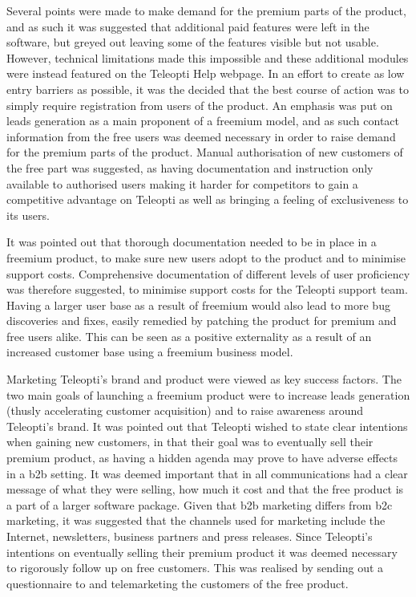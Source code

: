 Several points were made to make demand for the premium parts of the product, and as such it was suggested that additional paid features were left in the software, but greyed out leaving some of the features visible but not usable. However, technical limitations made this impossible and these additional modules were instead featured on the Teleopti Help webpage. In an effort to create as low entry barriers as possible, it was the decided that the best course of action was to simply require registration from users of the product. An emphasis was put on leads generation as a main proponent of a freemium model, and as such contact information from the free users was deemed necessary in order to raise demand for the premium parts of the product. Manual authorisation of new customers of the free part was suggested, as having documentation and instruction only available to authorised users making it harder for competitors to gain a competitive advantage on Teleopti as well as bringing a feeling of exclusiveness to its users.


It was pointed out that thorough documentation needed to be in place in a freemium product, to make sure new users adopt to the product and to minimise support costs. Comprehensive documentation of different levels of user proficiency was therefore suggested, to minimise support costs for the Teleopti support team. Having a larger user base as a result of freemium would also lead to more bug discoveries and fixes, easily remedied by patching the product for premium and free users alike. This can be seen as a positive externality as a result of an increased customer base using a freemium business model. 


Marketing Teleopti's brand and product were viewed as key success factors. The two main goals of launching a freemium product were to increase leads generation (thusly accelerating customer acquisition) and to raise awareness around Teleopti's brand. It was pointed out that Teleopti wished to state clear intentions when gaining new customers, in that their goal was to eventually sell their premium product, as having a hidden agenda may prove to have adverse effects in a \gls{b2b} setting. It was deemed important that in all communications had a clear message of what they were selling, how much it cost and that the free product is a part of a larger software package. Given that \gls{b2b} marketing differs from \gls{b2c} marketing, it was suggested that the channels used for marketing include the Internet, newsletters, business partners and press releases. Since Teleopti's intentions on eventually selling their premium product it was deemed necessary to rigorously follow up on free customers. This was realised by sending out a questionnaire to and telemarketing the customers of the free product. 


